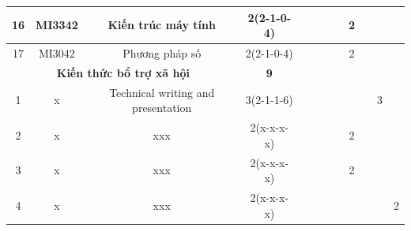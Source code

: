\documentclass[12pt,a4paper]{report}
\begin{document}
\begin{landscape}
\begin{longtable}[c]{|c|c|c|c|c|c|c|c|c|c|c|c|}
        16                            & MI3342                          & Kiến trúc máy tính                                           & 2(2-1-0-4)                                                                           &             &             &             &             & 2           &             &             &             \\ \hline
        17                            & MI3042                          & Phương pháp số                                               & 2(2-1-0-4)                                                                           &             &             &             &             & 2           &             &             &             \\ \hline
        \multicolumn{3}{|c|}{\textbf{Kiến thức bổ trợ xã hội}}                                                                         & \textbf{9}                                                                           &             &             &             &             &             &             &             &             \\ \hline
        1                             & x                               & Technical writing and presentation                           & 3(2-1-1-6)                                                                           &             &             &             &             &             &             & 3           &             \\ \hline
        2                             & x                               & xxx                                                          & 2(x-x-x-x)                                                                           &             &             &             &             & 2           &             &             &             \\ \hline
        3                             & x                               & xxx                                                          & 2(x-x-x-x)                                                                           &             &             &             &             & 2           &             &             &             \\ \hline
        4                             & x                               & xxx                                                          & 2(x-x-x-x)                                                                           &             &             &             &             &             &             &             & 2           \\ \hline

\end{longtable}
\end{landscape}
\end{document}
